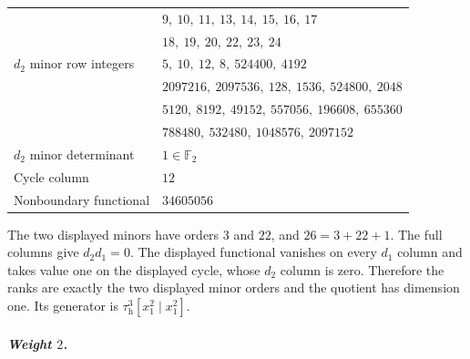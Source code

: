 \begin{longtable}{l l}
 & $9,\ 10,\ 11,\ 13,\ 14,\ 15,\ 16,\ 17$\\
 & $18,\ 19,\ 20,\ 22,\ 23,\ 24$\\
$d_2$ minor row integers & $5,\ 10,\ 12,\ 8,\ 524400,\ 4192$\\
 & $2097216,\ 2097536,\ 128,\ 1536,\ 524800,\ 2048$\\
 & $5120,\ 8192,\ 49152,\ 557056,\ 196608,\ 655360$\\
 & $788480,\ 532480,\ 1048576,\ 2097152$\\
$d_2$ minor determinant & $1\in\mathbb F_2$\\
Cycle column & $12$\\
Nonboundary functional & $34605056$\\
\end{longtable}
The two displayed minors have orders $3$ and $22$, and $26=3+22+1$. 
The full columns give $d_2d_1=0$. The displayed functional vanishes on every $d_1$ column and takes value one on the displayed cycle, whose $d_2$ column is zero. Therefore the ranks are exactly the two displayed minor orders and the quotient has dimension one. Its generator is $\tau_{\mathrm h}^{3}[x_1^2\mid x_1^2]$.
\subparagraph{Weight $2$.}
